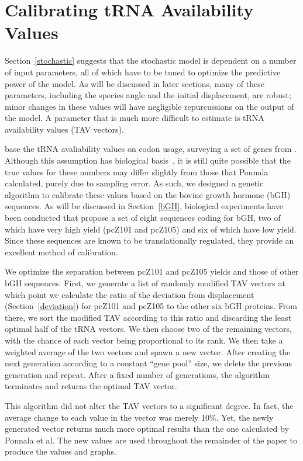 \documentclass[12pt, draft]{article}
\numberwithin{equation}{section}
\begin{document}

\section{Calibrating tRNA Availability Values}

Section~\ref{stochastic} suggests that the stochastic model is dependent
on a number of input parameters, all of which have to be tuned to optimize
the predictive power of the model.  As will be discussed in later sections,
many of these parameters, including the species angle and the initial displacement,
are robust; minor changes in these values will have negligible repurcussions
on the output of the model.  A parameter that is much more difficult to estimate
is tRNA availability values (TAV vectors).

\citeauthor{lalit:embs} base the tRNA avaliability values on codon usage, 
surveying a set of genes from \ecoli.
Although this assumption has biological basis~\cite{ikemura}, 
it is still quite possible that the true values for these numbers may differ 
slightly from those that Ponnala calculated, purely due to sampling error.  
As such, we designed a genetic algorithm to calibrate these values based on the bovine growth hormone (bGH) sequences.
As will be discussed in Section~\ref{bGH}, biological experiments
have been conducted \cite{schoner} that propose a set of eight sequences coding for bGH,
two of which have very high yield (pcZ101 and pcZ105) and six of which have low yield.
Since these sequences are known to be translationally regulated, they
provide an excellent method of calibration.

We optimize the separation between pcZ101 and pcZ105 yields and those of other bGH sequences.  
First, we generate a list of randomly modified TAV vectors at which
point we calculate the ratio of the deviation from
displacement (Section~\ref{deviation}) for pcZ101 and pcZ105 to the other
six bGH proteins. From there, we sort the modified TAV according to
this ratio and discarding the least optimal half of the tRNA
vectors. We then choose two of the remaining vectors, with the chance
of each vector being proportional to its rank.  We then take a
weighted average of the two vectors and spawn a new vector.  After
creating the next generation according to a constant ``gene pool''
size, we delete the previous generation and repeat. After a fixed
number of generations, the algorithm terminates and returns the
optimal TAV vector.

This algorithm did not alter the TAV vectors to a significant degree.
In fact, the average change to each value in the vector was merely
10\%.  Yet, the newly generated vector returns much more optimal
results than the one calculated by Ponnala et al.  The new values
are used throughout the remainder of the paper to produce the 
values and graphs.
\end{document}
